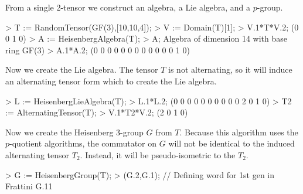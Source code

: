 \begin{example}
From a single 2-tensor we construct an algebra, a Lie algebra, and a $p$-group.

\begin{code}
> T := RandomTensor(GF(3),[10,10,4]);
> V := Domain(T)[1];
> V.1*T*V.2;
(0 0 1 0)
> A := HeisenbergAlgebra(T);
> A;
Algebra of dimension 14 with base ring GF(3)
> A.1*A.2;
(0 0 0 0 0 0 0 0 0 0 0 0 1 0)
\end{code}

Now we create the Lie algebra. 
The tensor $T$ is not alternating, so it will induce an alternating tensor form which to create the Lie algebra.

\begin{code}
> L := HeisenbergLieAlgebra(T);
> L.1*L.2;
(0 0 0 0 0 0 0 0 0 0 2 0 1 0)
> T2 := AlternatingTensor(T);
> V.1*T2*V.2;
(2 0 1 0)
\end{code}

Now we create the Heisenberg $3$-group $G$ from $T$.
Because this algorithm uses the $p$-quotient algorithms, the commutator on $G$ will not be identical to the induced alternating tensor $T_2$. 
Instead, it will be pseudo-isometric to the $T_2$.

\begin{code}
> G := HeisenbergGroup(T);  
> (G.2,G.1);  // Defining word for 1st gen in Frattini
G.11
\end{code}
\end{example}


